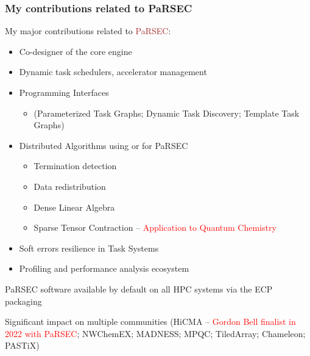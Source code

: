 \begin{frame}
  \frametitle{My contributions related to PaRSEC}
  
  My major contributions related to \textcolor{brown}{PaRSEC}:
  \begin{itemize}
  \item Co-designer of the core engine
  \item Dynamic task schedulers, accelerator management
  \item Programming Interfaces 
    \begin{itemize}
    \item (Parameterized Task Graphs; Dynamic Task Discovery; Template Task Graphs)
    \end{itemize}
  \item Distributed Algorithms using or for PaRSEC
    \begin{itemize}
    \item Termination detection 
    \item Data redistribution
    \item Dense Linear Algebra
    \item Sparse Tensor Contraction -- \textcolor{red}{Application to Quantum Chemistry} 
    \end{itemize}
  \item Soft errors resilience in Task Systems
  \item Profiling and performance analysis ecosystem
  \end{itemize}
  
  PaRSEC software available by default on all HPC systems via the ECP packaging
  
  Significant impact on multiple communities (HiCMA -- \textcolor{red}{Gordon Bell finalist in 2022 with PaRSEC}; NWChemEX; MADNESS; MPQC; TiledArray; Chameleon; PASTiX)
    
\end{frame}
